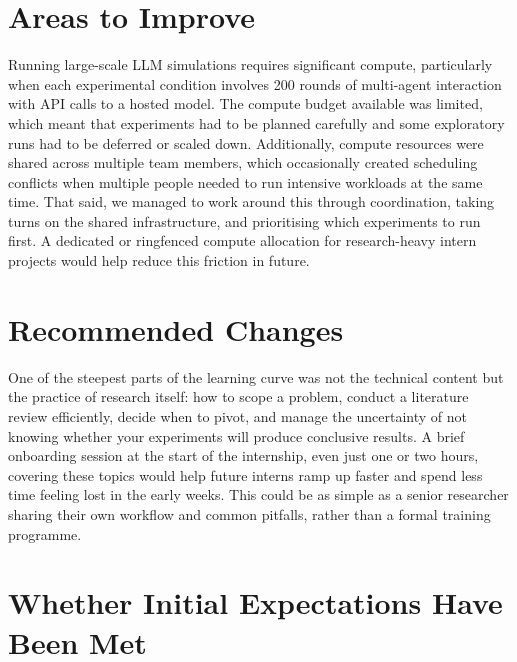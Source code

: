 \documentclass[12pt,a4paper]{article}
\begin{document}
\section{Areas to Improve}

Running large-scale LLM simulations requires significant compute, particularly when each experimental condition involves 200 rounds of multi-agent interaction with API calls to a hosted model. The compute budget available was limited, which meant that experiments had to be planned carefully and some exploratory runs had to be deferred or scaled down. Additionally, compute resources were shared across multiple team members, which occasionally created scheduling conflicts when multiple people needed to run intensive workloads at the same time. That said, we managed to work around this through coordination, taking turns on the shared infrastructure, and prioritising which experiments to run first. A dedicated or ringfenced compute allocation for research-heavy intern projects would help reduce this friction in future.



\section{Recommended Changes}

One of the steepest parts of the learning curve was not the technical content but the practice of research itself: how to scope a problem, conduct a literature review efficiently, decide when to pivot, and manage the uncertainty of not knowing whether your experiments will produce conclusive results. A brief onboarding session at the start of the internship, even just one or two hours, covering these topics would help future interns ramp up faster and spend less time feeling lost in the early weeks. This could be as simple as a senior researcher sharing their own workflow and common pitfalls, rather than a formal training programme.



\section{Whether Initial Expectations Have Been Met}
\end{document}
